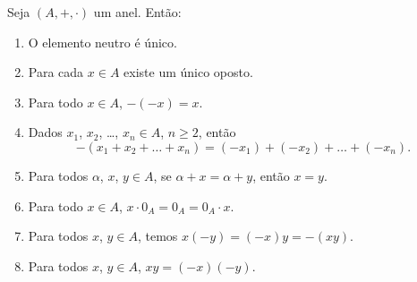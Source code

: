 \begin{proposicao}
	Seja $(A, + , \cdot)$ um anel. Ent\~ao:
	\begin{enumerate}[label={\roman*})]
		\item O elemento neutro {\'e} {\'u}nico.
		\item Para cada $x \in A$ existe um {\'u}nico oposto.
		\item Para todo $x \in A$, $-(-x) = x$.
		\item Dados $x_{1}$, $x_{2}$, \dots, $x_n \in A$, $n \geqslant 2$, ent{\~a}o
		\[
			-(x_1 + x_2 + \dots + x_n) = (-x_1) + (-x_2) + \dots + (-x_n).
		\]
		\item Para todos $\alpha$, $x$, $y \in A$, se $\alpha + x = \alpha + y$, ent{\~a}o $x = y$.
		\item Para todo $x \in A$, $x\cdot 0_A = 0_A = 0_A\cdot x$.
		\item Para todos $x$, $y \in A$, temos $x(-y) = (-x)y = -(xy)$.
		\item Para todos $x$, $y \in A$, $xy = (-x)(-y)$.
	\end{enumerate}
\end{proposicao}
